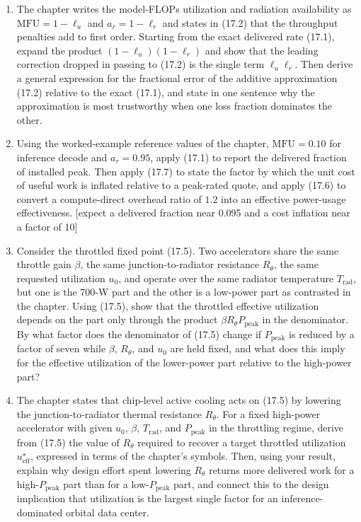 \documentclass[
  11pt,
  openany,
  oneside]{book}
\begin{document}
\begin{enumerate}
\def\labelenumi{\arabic{enumi}.}
\item
  The chapter writes the model-FLOPs utilization and radiation
  availability as \(\mathrm{MFU} = 1 - \ell_u\) and \(a_r = 1 - \ell_r\)
  and states in (17.2) that the throughput penalties add to first order.
  Starting from the exact delivered rate (17.1), expand the product
  \((1 - \ell_u)(1 - \ell_r)\) and show that the leading correction
  dropped in passing to (17.2) is the single term \(\ell_u \ell_r\).
  Then derive a general expression for the fractional error of the
  additive approximation (17.2) relative to the exact (17.1), and state
  in one sentence why the approximation is most trustworthy when one
  loss fraction dominates the other.
\item
  Using the worked-example reference values of the chapter,
  \(\mathrm{MFU} = 0.10\) for inference decode and \(a_r = 0.95\), apply
  (17.1) to report the delivered fraction of installed peak. Then apply
  (17.7) to state the factor by which the unit cost of useful work is
  inflated relative to a peak-rated quote, and apply (17.6) to convert a
  compute-direct overhead ratio of \(1.2\) into an effective power-usage
  effectiveness. {[}expect a delivered fraction near 0.095 and a cost
  inflation near a factor of 10{]}
\item
  Consider the throttled fixed point (17.5). Two accelerators share the
  same throttle gain \(\beta\), the same junction-to-radiator resistance
  \(R_{\theta}\), the same requested utilization \(u_0\), and operate
  over the same radiator temperature \(T_{\mathrm{rad}}\), but one is
  the 700-W part and the other is a low-power part as contrasted in the
  chapter. Using (17.5), show that the throttled effective utilization
  depends on the part only through the product
  \(\beta R_{\theta} P_{\mathrm{peak}}\) in the denominator. By what
  factor does the denominator of (17.5) change if \(P_{\mathrm{peak}}\)
  is reduced by a factor of seven while \(\beta\), \(R_{\theta}\), and
  \(u_0\) are held fixed, and what does this imply for the effective
  utilization of the lower-power part relative to the high-power part?
\item
  The chapter states that chip-level active cooling acts on (17.5) by
  lowering the junction-to-radiator thermal resistance \(R_{\theta}\).
  For a fixed high-power accelerator with given \(u_0\), \(\beta\),
  \(T_{\mathrm{rad}}\), and \(P_{\mathrm{peak}}\) in the throttling
  regime, derive from (17.5) the value of \(R_{\theta}\) required to
  recover a target throttled utilization \(u_{\mathrm{eff}}^{\star}\),
  expressed in terms of the chapter's symbols. Then, using your result,
  explain why design effort spent lowering \(R_{\theta}\) returns more
  delivered work for a high-\(P_{\mathrm{peak}}\) part than for a
  low-\(P_{\mathrm{peak}}\) part, and connect this to the design
  implication that utilization is the largest single factor for an
  inference-dominated orbital data center.
\end{enumerate}
\end{document}
